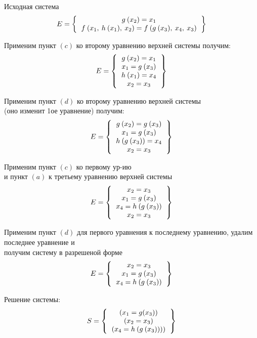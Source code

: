     \begin{example}\end{example}
			Исходная система
		\[
		E=
			\left \{
			\begin{tabular}{c}
				$g\:(x_2)=x_1$\\
				$f\:(x_1,\: h\: (x_1),\: x_2)=f\:(g\:(x_3),\: x_4,\: x_3)$
			\end{tabular}
			\right \}
		\]

			Применим пункт $(c)$ ко второму уравнению верхней системы получим:
			\[
		E=
			\left \{
			\begin{tabular}{c}
				$g\:(x_2)=x_1$\\
				$x_1=g\:(x_3)$\\
				$h\:(x_1)=x_4$\\
				$x_2=x_3$
			\end{tabular}
			\right \}
		\]

			Применим пункт $(d)$ ко второму уравнению верхней системы\\
				(оно изменит 1ое уравнение) получим:
			\[
			E=
			\left \{
			\begin{tabular}{c}
				$g\:(x_2)=g\:(x_3)$\\
				$x_1=g\:(x_3)$\\
				$h\:(g\:(x_3))=x_4$\\
				$x_2=x_3$

			\end{tabular}
			\right \}
		\]

			Применим пункт $(c)$ ко первому ур-ию\\
				и пункт $(a)$ к третьему уравнению верхней системы
			\[
			E=
			\left \{
			\begin{tabular}{c}
				$x_2=x_3$\\
				$x_1=g\:(x_3)$\\
				$x_4=h\:(g\:(x_3))$\\
				$x_2=x_3$
			\end{tabular}
			\right \}
		\]

			Применим пункт $(d)$ для первого уравнения к последнему уравнению, удалим последнее уравнение и \\
			получим систему в разрешеной форме
\[
			E=
			\left \{
			\begin{tabular}{c}
				$x_2=x_3$\\
				$x_1=g\:(x_3)$\\
				$x_4=h\:(g\:(x_3))$
			\end{tabular}
			\right \}
		\]

			Решение системы:
		\[		S=
			\left \{
			\begin{tabular}{c}
				$(x_1=g(x_3))$\\
				$(x_2=x_3)$\\
				$(x_4=h\:(g\:(x_3))))$\\
			\end{tabular}
			\right \}
		\]				
			
